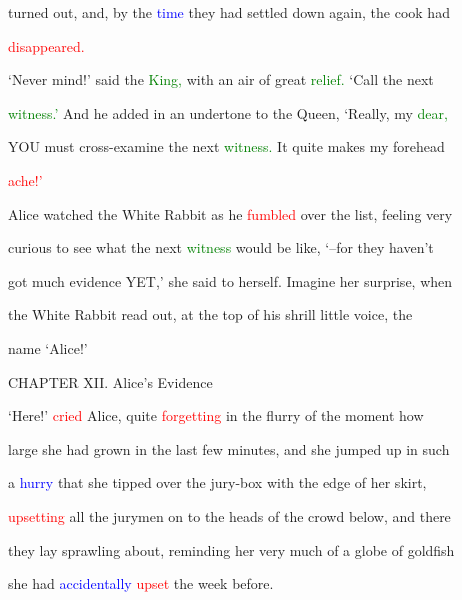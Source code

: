  turned out, and, by the \textcolor{blue}{time} they had settled down again, the cook had

 \textcolor{red}{disappeared.}



 ‘Never mind!’ said the \textcolor{green}{King,} with an air of great \textcolor{green}{relief.} ‘Call the next

 \textcolor{green}{witness.’} And he added in an undertone to the Queen, ‘Really, my \textcolor{green}{dear,}

 YOU must cross-examine the next \textcolor{green}{witness.} It quite makes my forehead

 \textcolor{red}{ache!’}



 Alice \textcolor{BurntOrange}{watched} the \textcolor{BurntOrange}{White} Rabbit as he \textcolor{red}{fumbled} over the list, feeling very

 curious to see what the next \textcolor{green}{witness} would be like, ‘--for they haven’t

 got much evidence YET,’ she said to herself. Imagine her \textcolor{BurntOrange}{surprise,} when

 the \textcolor{BurntOrange}{White} Rabbit read out, at the \textcolor{BurntOrange}{top} of his \textcolor{BurntOrange}{shrill} little voice, the

 name ‘Alice!’









 CHAPTER XII. Alice’s Evidence





 ‘Here!’ \textcolor{red}{cried} Alice, quite \textcolor{red}{forgetting} in the flurry of the moment how

 large she had grown in the last few minutes, and she jumped up in such

 a \textcolor{blue}{hurry} that she tipped over the jury-box with the edge of her skirt,

 \textcolor{red}{upsetting} all the jurymen on to the heads of the crowd below, and there

 they lay sprawling about, reminding her very much of a globe of goldfish

 she had \textcolor{blue}{accidentally} \textcolor{red}{upset} the week before.



